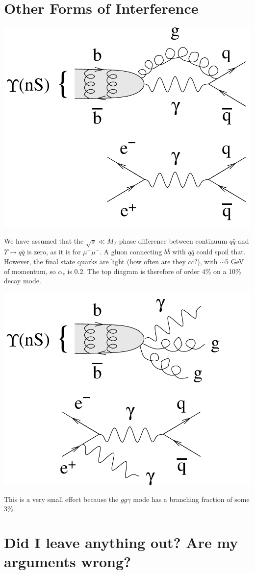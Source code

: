 \documentclass[12pt]{article}
\begin{document}
\vfill

\mbox{ }

\pagebreak

\section*{Other Forms of Interference}

\begin{center}
\includegraphics[width=0.5\linewidth]{interference-qqonly}
\end{center}

We have assumed that the $\sqrt{s} \ll M_\Upsilon$ phase difference
between continuum $q\bar{q}$ and $\Upsilon \to q\bar{q}$ is zero, as
it is for $\mu^+\mu^-$.  A gluon connecting $b\bar{b}$ with $q\bar{q}$
could spoil that.  However, the final state quarks are light (how
often are they $c\bar{c}$?), with $\sim$5 GeV of momentum, so
$\alpha_s$ is 0.2.  The top diagram is therefore of order 4\% on a
10\% decay mode.

\vfill

\begin{center}
\includegraphics[width=0.5\linewidth]{interference-gggamma}
\end{center}

This is a very small effect because the $gg\gamma$ mode has a
branching fraction of some 3\%.

\vfill

\section*{Did I leave anything out?  Are my arguments wrong?}
\end{document}
